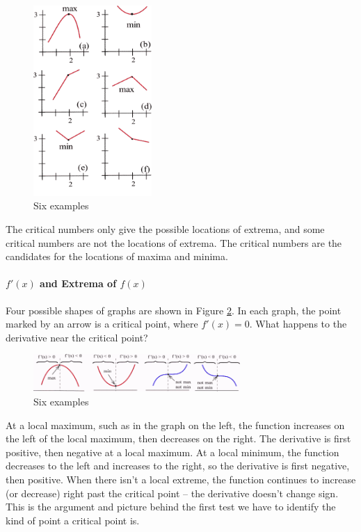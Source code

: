 \begin{figure}[!ht]
  \centering
    \includegraphics[width=0.4\textwidth]{img/chap3/image060.png}
    \caption{Six examples}
    \label{fig:3-4-6examples}
\end{figure}

The critical numbers only give the possible locations of extrema, and some critical numbers are not the locations of extrema. The critical numbers are the candidates for the locations of maxima and minima.

\paragraph*{$f'(x)$ and Extrema of $f(x)$}
Four possible shapes of graphs are shown in Figure \ref{fig:3-4-1derivtest}. In each graph, the point marked by an arrow is a critical point, where $f'(x)=0$. What happens to the derivative near the critical point?

\begin{figure}[!ht]
  \centering
    \includegraphics[width=0.7\textwidth]{img/chap3/image061.png}
    \caption{Six examples}
    \label{fig:3-4-1derivtest}
\end{figure}

At a local maximum, such as in the graph on the left, the function increases on the left of the local maximum, then decreases on the right. The derivative is first positive, then negative at a local maximum. At a local minimum, the function decreases to the left and increases to the right, so the derivative is first negative, then positive. When there isn't a local extreme, the function continues to increase (or decrease) right past the critical point -- the derivative doesn't change sign. This is the argument and picture behind the first test we have to identify the kind of point a critical point is.


